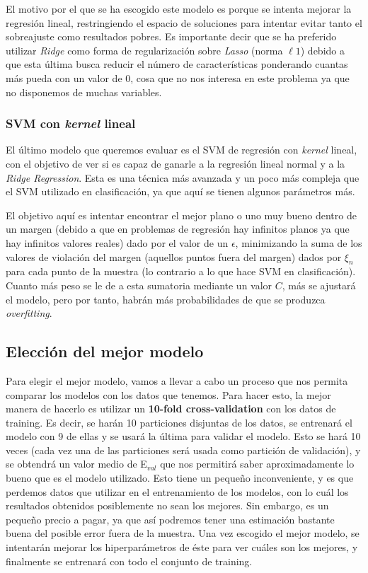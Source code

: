 \documentclass[11pt,a4paper]{article}
\begin{document}
El motivo por el que se ha escogido este modelo es porque se intenta
mejorar la regresión lineal, restringiendo el espacio de soluciones para
intentar evitar tanto el sobreajuste como resultados pobres. Es
importante decir que se ha preferido utilizar \emph{Ridge} como forma de
regularización sobre \emph{Lasso} (norma \(\ell 1\)) debido a que esta
última busca reducir el número de características ponderando cuantas más
pueda con un valor de \(0\), cosa que no nos interesa en este problema
ya que no disponemos de muchas variables.

\subsubsection{\texorpdfstring{SVM con \emph{kernel}
lineal}{SVM con kernel lineal}}\label{svm-con-kernel-lineal}

El último modelo que queremos evaluar es el SVM de regresión con
\emph{kernel} lineal, con el objetivo de ver si es capaz de ganarle a la
regresión lineal normal y a la \emph{Ridge Regression}. Esta es una
técnica más avanzada y un poco más compleja que el SVM utilizado en
clasificación, ya que aquí se tienen algunos parámetros más.

El objetivo aquí es intentar encontrar el mejor plano o uno muy bueno
dentro de un margen (debido a que en problemas de regresión hay
infinitos planos ya que hay infinitos valores reales) dado por el valor
de un \(\epsilon\), minimizando la suma de los valores de violación del
margen (aquellos puntos fuera del margen) dados por \(\xi_n\) para cada
punto de la muestra (lo contrario a lo que hace SVM en clasificación).
Cuanto más peso se le de a esta sumatoria mediante un valor \(C\), más
se ajustará el modelo, pero por tanto, habrán más probabilidades de que
se produzca \emph{overfitting}.

    \subsection{Elección del mejor
modelo}\label{elecciuxf3n-del-mejor-modelo}

Para elegir el mejor modelo, vamos a llevar a cabo un proceso que nos
permita comparar los modelos con los datos que tenemos. Para hacer esto,
la mejor manera de hacerlo es utilizar un \textbf{10-fold
cross-validation} con los datos de training. Es decir, se harán 10
particiones disjuntas de los datos, se entrenará el modelo con 9 de
ellas y se usará la última para validar el modelo. Esto se hará 10 veces
(cada vez una de las particiones será usada como partición de
validación), y se obtendrá un valor medio de E\(_{val}\) que nos
permitirá saber aproximadamente lo bueno que es el modelo utilizado.
Esto tiene un pequeño inconveniente, y es que perdemos datos que
utilizar en el entrenamiento de los modelos, con lo cuál los resultados
obtenidos posiblemente no sean los mejores. Sin embargo, es un pequeño
precio a pagar, ya que así podremos tener una estimación bastante buena
del posible error fuera de la muestra. Una vez escogido el mejor modelo,
se intentarán mejorar los hiperparámetros de éste para ver cuáles son
los mejores, y finalmente se entrenará con todo el conjunto de training.
\end{document}
